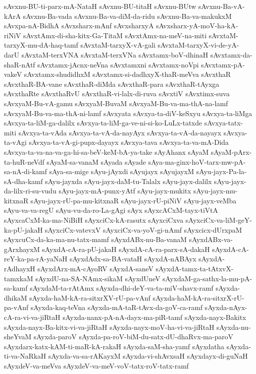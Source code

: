 {sAvxnu-BU-ti-parx-mA-NataH
sAvxnu-BU-titaH
sAvxnu-BUtw
sAvxnu-Ba-vA-kArA
sAvxnu-Ba-vada
sAvxnu-Ba-va-diM-da-ridu
sAvxnu-Ba-va-makukxM
sAvxpa-nA-BidhA
sAvxsharx-mAnf
sAvxsharxyA
sAvxsharx-yA-moV-ha-kA-riNiV
sAvxtAmx-di-sha-kitx-Ga-TitaM
sAvxtAmx-na-meV-na-miti
sAvxtaM-tarxyX-mu-dA-haq-tamf
sAvxtaM-tarxyX-vA-gali
sAvxtaM-tarxyX-vi-de-yA-darU
sAvxtaM-terxVNA
sAvxtaM-terxVNa
sAvxtamx-boV-dhinaH
sAvxtamx-da-shaR-nAtf
sAvxtamx-jAcnx-neVna
sAvxtamxni
sAvxtamx-noVpi
sAvxtamx-pA-vakeV
sAvxtamx-shudidhxM
sAvxtamx-si-dadhxyX-thaR-meVva
sAvxthaR
sAvxthaR-BA-vane
sAvxthaR-diMda
sAvxthaR-para
sAvxthaR-tAyxga
sAvxthaRte
sAvxthaRvU
sAvxthaR-vi-lalx-di-ruva
sAvxtiV
sAvxtimx-suva
sAvxyaM-Bu-vA-gamu
sAvxyaM-BuvaM
sAvxyaM-Bu-va-ma-thA-na-lamf
sAvxyaM-Bu-va-ma-thA-ni-lamf
sAvxyata
sAvxya-ta-diV-keSxyu
sAvxya-ta-liMga
sAvxya-ta-liM-ga-dalilx
sAvxya-ta-liM-ga-ve-ni-si-ko-LuLx-tatxde
sAvxya-tatx-miti
sAvxya-ta-vAda
sAvxya-ta-vA-da-nayAyx
sAvxya-ta-vA-da-nayayx
sAvxya-ta-vAgi
sAvxya-ta-vA-gi-pupx-dayayx
sAvxya-tava
sAvxya-ta-va-mA-Dida
sAvxya-ta-va-na-va-ga-hi-sa-beV-keM-bA-ya-take
sAyAhanx
sAyaM
sAyaM-pArx-ta-huR-neVdf
sAyaM-sa-vanaM
sAyada
sAyade
sAya-ma-ginx-hoV-tarx-mw-pA-sa-nA-di-kamf
sAya-sa-mige
sAyu-jAyxdi
sAyujayx
sAyujayxM
sAyu-jayx-Pa-la-sA-dha-kamf
sAyu-jayxda
sAyu-jayx-daM-tu-Talalx
sAyu-jayx-dalilx
sAyu-jayx-da-lilx-ri-su-vudu
sAyu-jayx-mA-punx-yAtf
sAyu-jayx-mukitx
sAyu-jayx-mu-kitxnaR
sAyu-jayx-rU-pa-mu-kitxnaR
sAyu-jayx-rU-piNiV
sAyu-jayx-veMba
sAyu-va-va-regU
sAyu-vu-da-ro-La-gAgi
sAyx
sAyxcACxM-tayx-tiVtA
sAyxcaCxM-ka-ma-NiBiH
sAyxciCx-kA-rasutx
sAyxciCxva
sAyxciCx-va-liM-geY-ka-pU-jakaH
sAyxciCx-vatevxV
sAyxciCx-va-yoV-gi-nAmf
sAyxcicx-dUrxpaM
sAyxcuCx-da-ka-ma-nu-tatx-mamf
sAyxdABx-nu-Ba-vanaM
sAyxdABx-va-gArxhayxM
sAyxdA-cA-ra-pU-jakaH
sAyxdA-cA-ra-parx-sA-dakaH
sAyxdA-cA-reY-ka-pa-rA-yaNaH
sAyxdAdx-sa-BA-vataH
sAyxdA-nABAyx
sAyxdA-rAdhayxH
sAyxdArx-mA-cAyoRV
sAyxdA-saneV
sAyxdA-tamx-ta-tAtxvX-tamxkaM
sAyxdU-na-SA-NAmx-sikaM
sAyxdUneV
sAyxdaM-ga-sathx-la-mu-pA-sa-kamf
sAyxdaM-ta-rAtAmx
sAyxda-dhi-deY-va-ta-miV-shavx-ramf
sAyxda-dhikaM
sAyxda-haM-kA-ra-sitxrXV-rU-pa-vAnf
sAyxda-haM-kA-ra-sitxrX-rU-pa-vAnf
sAyxda-kaq-teVna
sAyxda-mA-taR-tAvx-da-goV-ca-ramf
sAyxda-nAyx-cA-ra-vi-va-jiRtaH
sAyxda-nanx-pA-nA-dayx-ma-piR-tamf
sAyxda-nayx-Bakitx
sAyxda-nayx-Ba-kitx-vi-va-jiRtaH
sAyxda-nayx-moV-ha-vi-va-jiRtaH
sAyxda-nu-sheYvaM
sAyxda-paroV
sAyxda-pa-roV-biM-du-satx-dU-dhaRvx-ma-paroV
sAyxdarx-katx-kAM-ti-maR-kA-rakaH
sAyxda-saM-sha-yamf
sAyxdatha
sAyxda-ti-va-NaRkaH
sAyxda-va-sa-rAKayxM
sAyxda-vi-shAvxsaH
sAyxdayx-di-guNaH
sAyxdeV-va-meVva
sAyxdeV-va-meV-voV-tatx-roV-tatx-ramf
}
